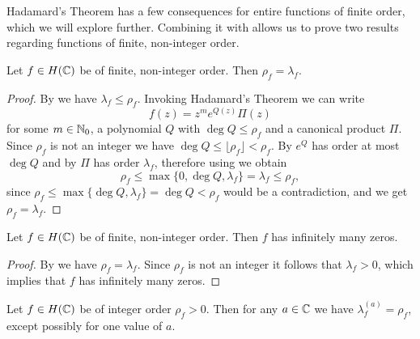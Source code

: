 Hadamard's Theorem has a few consequences for entire functions of finite order, which we will explore further. Combining it with  allows us to prove two results regarding functions of finite, non-integer order.

\begin{theorem} \label{thm:finite-non-integer-order-equals-exponent-of-convergence}
    Let $f \in H(\mathbb{C})$ be of finite, non-integer order. Then $\rho_f = \lambda_f$.
\end{theorem}

\begin{proof}
    By  we have $\lambda_f \leq \rho_f$. Invoking Hadamard's Theorem we can write
    $$ f(z) = z^m e^{Q(z)} \Pi(z) $$
    for some $m \in \mathbb{N}_0$, a polynomial $Q$ with $\deg Q \leq \rho_f$ and a canonical product $\Pi$. Since $\rho_f$ is not an integer we have $\deg Q \leq \lfloor \rho_f \rfloor < \rho_f$. By  $e^Q$ has order at most $\deg Q$ and by  $\Pi$ has order $\lambda_f$, therefore using  we obtain
    $$ \rho_f \leq \max \{ 0, \deg Q, \lambda_f \} = \lambda_f \leq \rho_f, $$
    since $\rho_f \leq \max \{ \deg Q, \lambda_f \} = \deg Q < \rho_f$ would be a contradiction, and we get $\rho_f = \lambda_f$.
\end{proof}

\begin{theorem} \label{thm:finite-non-integer-order-infinite-zeros}
    Let $f \in H(\mathbb{C})$ be of finite, non-integer order. Then $f$ has infinitely many zeros.
\end{theorem}

\begin{proof}
    By  we have $\rho_f = \lambda_f$. Since $\rho_f$ is not an integer it follows that $\lambda_f > 0$, which implies that $f$ has infinitely many zeros.
\end{proof}

\begin{theorem}[Borel] \label{thm:existence-borel-exceptional-values}
    Let $f \in H(\mathbb{C})$ be of integer order $\rho_f > 0$. Then for any $a \in \mathbb{C}$ we have $\lambda_f^{(a)} = \rho_f$, except possibly for one value of $a$.
\end{theorem}

